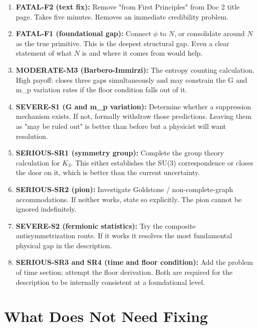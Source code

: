 \documentclass[11pt,letterpaper]{article}
\begin{document}
\begin{enumerate}
\item \textbf{FATAL-F2 (text fix):} Remove "from First Principles" from Doc 2 title page.
Takes five minutes. Removes an immediate credibility problem.

\item \textbf{FATAL-F1 (foundational gap):} Connect \(\phi\) to \(N\), or consolidate
around \(N\) as the true primitive. This is the deepest structural gap. Even
a clear statement of what \(N\) is and where it comes from would help.

\item \textbf{MODERATE-M3 (Barbero-Immirzi):} The entropy counting calculation. High
payoff: closes three gaps simultaneously and may constrain the G and m\_p
variation rates if the floor condition falls out of it.

\item \textbf{SEVERE-S1 (G and m\_p variation):} Determine whether a suppression mechanism
exists. If not, formally withdraw those predictions. Leaving them as
"may be ruled out" is better than before but a physicist will want resolution.

\item \textbf{SERIOUS-SR1 (symmetry group):} Complete the group theory calculation for
\(K_3\). This either establishes the SU(3) correspondence or closes the door
on it, which is better than the current uncertainty.

\item \textbf{SERIOUS-SR2 (pion):} Investigate Goldstone / non-complete-graph
accommodations. If neither works, state so explicitly. The pion cannot be
ignored indefinitely.

\item \textbf{SEVERE-S2 (fermionic statistics):} Try the composite antisymmetrization
route. If it works it resolves the most fundamental physical gap in the
description.

\item \textbf{SERIOUS-SR3 and SR4 (time and floor condition):} Add the problem of time
section; attempt the floor derivation. Both are required for the description
to be internally consistent at a foundational level.
\end{enumerate}

\section{What Does Not Need Fixing}
\label{sec:org01c00a3}
\end{document}
